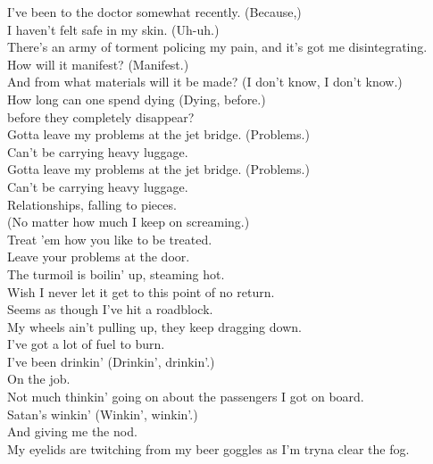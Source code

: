 


I've been to the doctor somewhat recently. (Because,) \\
I haven't felt safe in my skin. (Uh-uh.) \\
There's an army of torment policing my pain, and it's got me disintegrating. \\
How will it manifest? (Manifest.) \\
And from what materials will it be made? (I don't know, I don't know.) \\
How long can one spend dying (Dying, before.) \\
before they completely disappear? \\

Gotta leave my problems at the jet bridge. (Problems.) \\
Can't be carrying heavy luggage. \\
Gotta leave my problems at the jet bridge. (Problems.) \\
Can't be carrying heavy luggage. \\
Relationships, falling to pieces. \\
(No matter how much I keep on screaming.) \\
Treat 'em how you like to be treated. \\
Leave your problems at the door. \\

The turmoil is boilin' up, steaming hot. \\
Wish I never let it get to this point of no return. \\
Seems as though I've hit a roadblock. \\
My wheels ain't pulling up, they keep dragging down. \\
I've got a lot of fuel to burn. \\
I've been drinkin' (Drinkin', drinkin'.) \\
On the job. \\
Not much thinkin' going on about the passengers I got on board. \\
Satan's winkin' (Winkin', winkin'.) \\
And giving me the nod. \\
My eyelids are twitching from my beer goggles as I'm tryna clear the fog. \\

